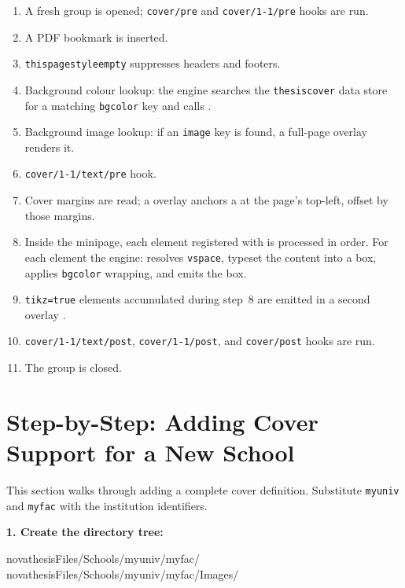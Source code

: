 \begin{enumerate}
  \item A fresh group is opened; \texttt{cover/pre} and
        \texttt{cover/1-1/pre} hooks are run.
  \item A \gls{PDF} bookmark is inserted.
  \item \texttt{thispagestyle{empty}} suppresses headers and footers.
  \item Background colour lookup: the engine searches the
        \texttt{thesiscover} data store for a matching \texttt{bgcolor} key
        and calls \latexinline{\pagecolor}.
  \item Background image lookup: if an \texttt{image} key is found, a
        full-page  overlay renders it.
  \item \texttt{cover/1-1/text/pre} hook.
  \item Cover margins are read; a  overlay anchors a
         at the page's top-left, offset by those margins.
  \item Inside the minipage, each element registered with
         is processed in order.
        For each element the engine: resolves \texttt{vspace}, typeset the
        content into a box, applies \texttt{bgcolor} wrapping, and emits the
        box.
  \item \texttt{tikz=true} elements accumulated during step~8 are emitted in
        a second overlay .
  \item \texttt{cover/1-1/text/post}, \texttt{cover/1-1/post}, and
        \texttt{cover/post} hooks are run.
  \item The group is closed.
\end{enumerate}


\section{Step-by-Step: Adding Cover Support for a New School}
\label{sec:covers_new_school}

This section walks through adding a complete cover definition.  Substitute
\texttt{myuniv} and \texttt{myfac} with the institution identifiers.

\medskip
\noindent\textbf{1.  Create the directory tree:}
\begin{bashcode}
novathesisFiles/Schools/myuniv/myfac/
novathesisFiles/Schools/myuniv/myfac/Images/
\end{bashcode}

